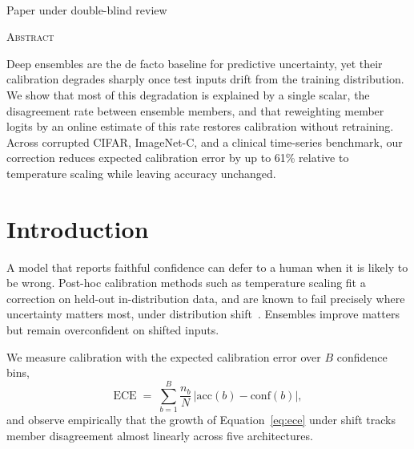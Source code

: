 \documentclass[10pt]{article}
\begin{document}
\thispagestyle{fancy}

\vspace{14pt}

\\
{\small Paper under double-blind review}
\vspace{18pt}

\begin{center}{\scshape\large Abstract}\end{center}
\begin{list}{}{\leftmargin=0.35in\rightmargin=0.35in}\item\relax
Deep ensembles are the de facto baseline for predictive uncertainty, yet their
calibration degrades sharply once test inputs drift from the training
distribution. We show that most of this degradation is explained by a single
scalar, the disagreement rate between ensemble members, and that reweighting
member logits by an online estimate of this rate restores calibration without
retraining. Across corrupted CIFAR, ImageNet-C, and a clinical time-series
benchmark, our correction reduces expected calibration error by up to 61\%
relative to temperature scaling while leaving accuracy unchanged.
\end{list}
\vspace{6pt}

\section{Introduction}
A model that reports faithful confidence can defer to a human when it is
likely to be wrong. Post-hoc calibration methods such as temperature scaling
fit a correction on held-out in-distribution data, and are known to fail
precisely where uncertainty matters most, under distribution
shift~\cite{aldana2023shift}. Ensembles improve matters but remain
overconfident on shifted inputs.

We measure calibration with the expected calibration error over $B$
confidence bins,
\begin{equation}
  \mathrm{ECE} \;=\; \sum_{b=1}^{B} \frac{n_b}{N}\,
  \bigl| \mathrm{acc}(b) - \mathrm{conf}(b) \bigr|,
  \label{eq:ece}
\end{equation}
and observe empirically that the growth of Equation~\eqref{eq:ece} under
shift tracks member disagreement almost linearly across five architectures.
\end{document}
